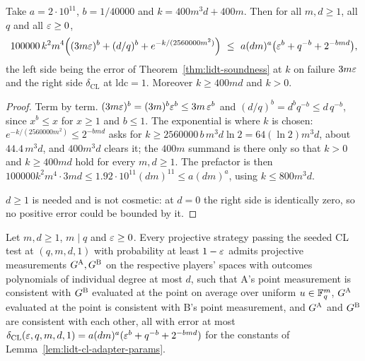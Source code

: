 \begin{lemma}
\label{lem:lidt-cl-adapter-params}
\leanok
Take $a=2\cdot10^{11}$, $b=1/40000$ and $k=400m^3d+400m$. Then for all $m,d\geq1$, all $q$ and all
$\varepsilon\geq0$,
\[
  100000\,k^2m^4\Bigl((3m\varepsilon)^{b}+(d/q)^{b}+e^{-k/(2560000m^2)}\Bigr)
  \ \leq\ a(dm)^{a}\bigl(\varepsilon^{b}+q^{-b}+2^{-bmd}\bigr),
\]
the left side being the error of Theorem~\ref{thm:lidt-soundness} at $k$ on failure $3m\varepsilon$ and
the right side $\delta_{\mathrm{CL}}$ at $\mathrm{ldc}=1$. Moreover $k\geq400md$ and $k>0$.
\end{lemma}

\begin{proof}
\leanok
Term by term. $(3m\varepsilon)^b=(3m)^b\varepsilon^b\leq 3m\,\varepsilon^b$ and $(d/q)^b=d^b q^{-b}\leq d\,q^{-b}$,
since $x^b\leq x$ for $x\geq1$ and $b\leq1$. The exponential is where $k$ is chosen:
$e^{-k/(2560000m^2)}\leq2^{-bmd}$ asks for $k\geq 2560000\,b\,m^3d\ln2=64(\ln2)m^3d$, about
$44.4\,m^3d$, and $400m^3d$ clears it; the $400m$ summand is there only so that $k>0$ and
$k\geq400md$ hold for every $m,d\geq1$. The prefactor is then
$100000k^2m^4\cdot3md\leq1.92\cdot10^{11}(dm)^{11}\leq a(dm)^a$, using $k\leq800m^3d$.

$d\geq1$ is needed and is not cosmetic: at $d=0$ the right side is identically zero, so no
positive error could be bounded by it.
\end{proof}

\begin{theorem}
\label{thm:lidt-cl-soundness-one}
\leanok
Let $m,d\geq1$, $m\mid q$ and $\varepsilon\geq0$. Every projective strategy passing the seeded CL test at
$(q,m,d,1)$ with probability at least $1-\varepsilon$ admits projective measurements
$G^{\textsc{A}},G^{\textsc{B}}$ on the respective players' spaces with outcomes polynomials of individual degree
at most $d$, such that A's point measurement is consistent with $G^{\textsc{B}}$ evaluated at the point on
average over uniform $u\in\mathbb{F}_q^m$, $G^{\textsc{A}}$ evaluated at the point is consistent with B's point
measurement, and $G^{\textsc{A}}$ and $G^{\textsc{B}}$ are consistent with each other, all with error at most
$\delta_{\mathrm{CL}}(\varepsilon,q,m,d,1)=a(dm)^a(\varepsilon^b+q^{-b}+2^{-bmd})$ for the constants of
Lemma~\ref{lem:lidt-cl-adapter-params}.
\end{theorem}

